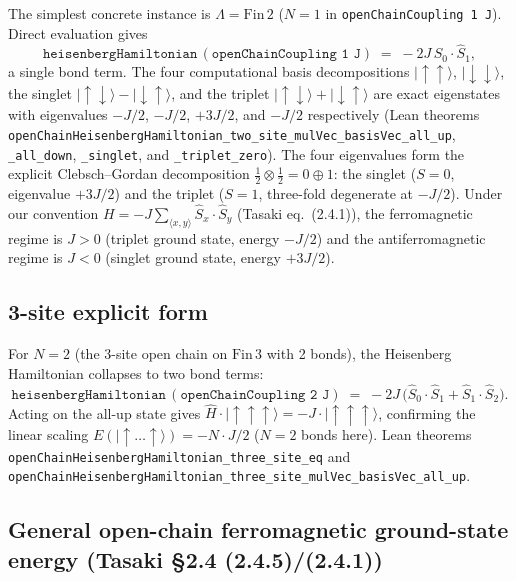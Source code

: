\documentclass[a4paper,11pt]{article}
\begin{document}
The simplest concrete instance is $\Lambda = \mathrm{Fin}\,2$
($N = 1$ in \texttt{openChainCoupling 1 J}).  Direct evaluation gives
\[
  \texttt{heisenbergHamiltonian}\,(\texttt{openChainCoupling 1 J})
  \;=\; -2J\,\hat S_{0}\!\cdot\!\hat S_{1},
\]
a single bond term.  The four computational basis decompositions
$|{\uparrow}{\uparrow}\rangle$, $|{\downarrow}{\downarrow}\rangle$,
the singlet $|{\uparrow}{\downarrow}\rangle - |{\downarrow}{\uparrow}\rangle$,
and the triplet $|{\uparrow}{\downarrow}\rangle + |{\downarrow}{\uparrow}\rangle$
are exact eigenstates with eigenvalues $-J/2$, $-J/2$, $+3J/2$, and
$-J/2$ respectively (Lean theorems
\texttt{openChainHeisenbergHamiltonian\_two\_site\_mulVec\_basisVec\_all\_up},
\texttt{\_all\_down},
\texttt{\_singlet}, and \texttt{\_triplet\_zero}).
The four eigenvalues form the explicit Clebsch--Gordan decomposition
$\tfrac{1}{2}\otimes\tfrac{1}{2} = 0\oplus 1$: the singlet
($S=0$, eigenvalue $+3J/2$) and the triplet ($S=1$, three-fold
degenerate at $-J/2$).  Under our convention $H = -J\sum_{\langle
x,y\rangle}\hat S_x\!\cdot\!\hat S_y$ (Tasaki eq.~(2.4.1)), the
ferromagnetic regime is $J > 0$ (triplet ground state, energy
$-J/2$) and the antiferromagnetic regime is $J < 0$ (singlet ground
state, energy $+3J/2$).

\subsection{3-site explicit form}
\label{subsec:three-site-explicit}

For $N = 2$ (the 3-site open chain on $\mathrm{Fin}\,3$ with 2 bonds),
the Heisenberg Hamiltonian collapses to two bond terms:
\[
  \texttt{heisenbergHamiltonian}\,(\texttt{openChainCoupling 2 J})
  \;=\; -2J\,\bigl(\hat S_{0}\!\cdot\!\hat S_{1}
                    + \hat S_{1}\!\cdot\!\hat S_{2}\bigr).
\]
Acting on the all-up state gives
$\hat H \cdot |{\uparrow}{\uparrow}{\uparrow}\rangle
   = -J \cdot |{\uparrow}{\uparrow}{\uparrow}\rangle$, confirming the
linear scaling $E(|{\uparrow}\dots{\uparrow}\rangle) = -N\cdot J/2$
($N = 2$ bonds here).  Lean theorems
\texttt{openChainHeisenbergHamiltonian\_three\_site\_eq} and
\texttt{openChainHeisenbergHamiltonian\_three\_site\_mulVec\_basisVec\_all\_up}.

\subsection{General open-chain ferromagnetic ground-state energy
(Tasaki §2.4 (2.4.5)/(2.4.1))}
\label{subsec:openchain-allup-general}
\end{document}
